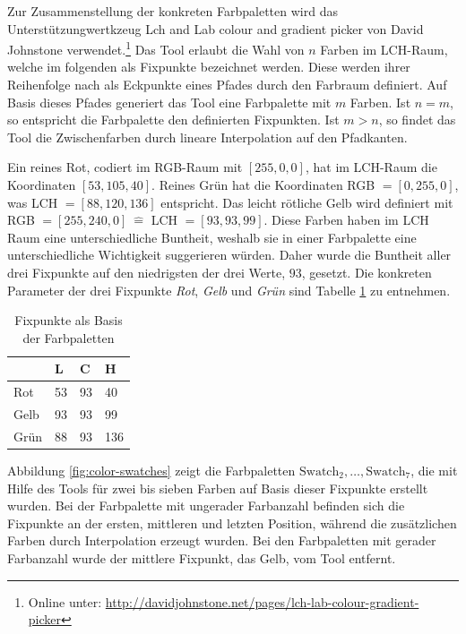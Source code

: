 Zur Zusammenstellung der konkreten Farbpaletten wird das Unterstützungwertkzeug \glqq Lch and Lab colour and gradient picker\grqq{} von David Johnstone verwendet.\footnote{Online unter: \url{http://davidjohnstone.net/pages/lch-lab-colour-gradient-picker}} Das Tool erlaubt die Wahl von $n$ Farben im LCH-Raum, welche im folgenden als \glqq Fixpunkte\grqq{} bezeichnet werden. Diese werden ihrer Reihenfolge nach als Eckpunkte eines Pfades durch den Farbraum definiert. Auf Basis dieses Pfades generiert das Tool eine Farbpalette mit $m$ Farben. Ist $n = m$, so entspricht die Farbpalette den definierten Fixpunkten. Ist $m > n$, so findet das Tool die Zwischenfarben durch lineare Interpolation auf den Pfadkanten.\cite{johnstone}

Ein \glqq reines Rot\grqq, codiert im RGB-Raum mit $[255,0,0]$, hat im LCH-Raum die Koordinaten $[53,105,40]$. \glqq Reines Grün\grqq{} hat die Koordinaten RGB $=[0,255,0]$, was LCH $= [88,120,136]$ entspricht. Das \glqq leicht rötliche Gelb\grqq{} wird definiert mit RGB $=[255,240,0]\ \hat{=}$ LCH $= [93,93,99]$. Diese Farben haben im LCH Raum eine unterschiedliche Buntheit, weshalb sie in einer Farbpalette eine unterschiedliche Wichtigkeit suggerieren würden.\cite{bigman} Daher wurde die Buntheit aller drei Fixpunkte auf den niedrigsten der drei Werte, $93$, gesetzt. Die konkreten Parameter der drei Fixpunkte \emph{Rot}, \emph{Gelb} und \emph{Grün} sind Tabelle \ref{tab:fixpoints} zu entnehmen. 

\begin{table}[h]
\centering
\caption{Fixpunkte als Basis der Farbpaletten}
\label{tab:fixpoints}
\begin{tabular}{@{}llll@{}}
\toprule
                                     & L      & C     & H      \\ \midrule
Rot   & 53     & 93    & 40     \\
Gelb  & 93     & 93    & 99     \\
Grün  & 88     & 93    & 136    \\ \bottomrule
\end{tabular}
\end{table}

Abbildung \ref{fig:color-swatches} zeigt die Farbpaletten $\text{Swatch}_2, \ldots, \text{Swatch}_7$, die mit Hilfe des Tools für zwei bis sieben Farben auf Basis dieser Fixpunkte erstellt wurden. Bei der Farbpalette mit ungerader Farbanzahl befinden sich die Fixpunkte an der ersten, mittleren und letzten Position, während die zusätzlichen Farben durch Interpolation erzeugt wurden. Bei den Farbpaletten mit gerader Farbanzahl wurde der mittlere Fixpunkt, das Gelb, vom Tool entfernt.

